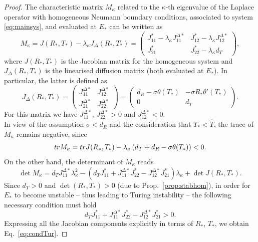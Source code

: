 \documentclass[10pt,a4paper]{amsart}
\begin{document}
\begin{proof}
The characteristic matrix $M_\kappa$ related to the $\kappa$-th eigenvalue of the Laplace operator with homogeneous Neumann boundary conditions, associated to system \eqref{eq:mainsys}, and evaluated at $E_*$ can be written as
\begin{equation}
    M_\kappa = J(R_*,T_*) -\lambda_\kappa J_\Delta(R_*,T_*) = \begin{pmatrix} 
J_{11}^*-\lambda_\kappa J^{\Delta*}_{11} & J_{12}^*-\lambda_\kappa J^{\Delta*}_{12} \\[0.3cm] 
J_{21}^* & J_{22}^*-\lambda_\kappa d_T
\end{pmatrix},
\end{equation}
where $J(R_*,T_*)$ is the Jacobian matrix for the homogeneous system and $J_\Delta(R_*,T_*)$ is the linearised diffusion matrix (both evaluated at $E_*$). In particular, the latter is defined as
\begin{equation*}
J_\Delta(R_*,T_*)=
\begin{pmatrix} 
J^{\Delta*}_{11} & J^{\Delta*}_{12} \\[0.2cm]
J^{\Delta*}_{21} & J^{\Delta*}_{22} 
\end{pmatrix}=
\begin{pmatrix} 
d_R-\sigma \theta(T_*) & -\sigma R_* \theta'(T_*)\\[0.3cm] 
0 & d_T
\end{pmatrix}.
\end{equation*}
For this matrix we have $J^{\Delta*}_{11},\,J^{\Delta*}_{22}>0$ and $J^{\Delta*}_{12}<0$.\\
In view of the assumption $\sigma<d_R$ and the consideration that $T_*<\hat{T}$, the trace of $M_\kappa$ remains negative, since
\[
\textnormal{tr}M_\kappa=\textnormal{tr}J(R_*,T_*)-\lambda_\kappa\left(d_T+d_R-\sigma \theta(T_*)\right)<0.
\]
On the other hand, the determinant of $M_\kappa$ reads
\[
\det M_\kappa=
d_T J^{\Delta*}_{11} \lambda_\kappa^2
-\left( d_T J^{*}_{11}+ J^{\Delta*}_{11}J^{*}_{22}
-J^{\Delta *}_{12}J^{*}_{21}\right) \lambda_\kappa
+\det J(R_*,T_*).
\]
Since $d_T>0$ and $\det (R_*,T_*)>0$ (due to Prop.~\ref{prop:stabhom}), in order for $E_*$ to become unstable -- thus leading to Turing instability -- the following necessary condition must hold
\[
d_T J^{*}_{11}+ J^{\Delta*}_{11}J^{*}_{22} -J^{\Delta *}_{12}J^{*}_{21}>0.
\]
Expressing all the Jacobian components explicitly in terms of $R_*$, $T_*$, we obtain Eq.~\eqref{eq:condTur}.
\end{proof}
\end{document}
